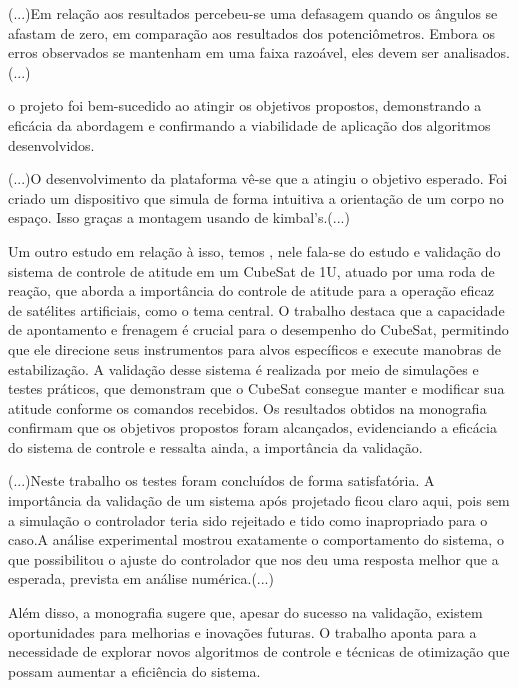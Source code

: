 \documentclass[
	12pt,				%
	openright,			%
	oneside,			%
	a4paper,			%
	english,			%
	brazil				%
	]{abntex2}
\begin{document}
\begin{citacao}
	(...)Em relação aos resultados percebeu-se uma defasagem quando os
	ângulos se afastam de zero, em comparação aos resultados dos potenciômetros. Embora
	os erros observados se mantenham em uma faixa razoável, eles devem ser analisados.(...)
\end{citacao}

 o projeto foi bem-sucedido ao atingir os objetivos propostos, demonstrando a eficácia da abordagem e confirmando a viabilidade de aplicação dos algoritmos desenvolvidos.
 
\begin{citacao}
	(...)O desenvolvimento da plataforma vê-se que a atingiu o objetivo esperado. Foi
	criado um dispositivo que simula de forma intuitiva a orientação de um corpo no espaço.
	Isso graças a montagem usando de kimbal’s.(...)
\end{citacao}


Um outro estudo em relação à isso, temos \cite{faustino2019}, nele fala-se do estudo e validação do sistema de controle de atitude em um CubeSat de 1U, atuado por uma roda de reação, que aborda a importância do controle de atitude para a operação eficaz de satélites artificiais, como o tema central. O trabalho destaca que a capacidade de apontamento e frenagem é crucial para o desempenho do CubeSat, permitindo que ele direcione seus instrumentos para alvos específicos e execute manobras de estabilização.
A validação desse sistema é realizada por meio de simulações e testes práticos, que demonstram que o CubeSat consegue manter e modificar sua atitude conforme os comandos recebidos. Os resultados obtidos na monografia confirmam que os objetivos propostos foram alcançados, evidenciando a eficácia do sistema de controle e ressalta ainda, a importância da validação.

\begin{citacao}
	(...)Neste trabalho os testes foram concluídos de forma satisfatória. A importância da validação de um sistema após projetado ficou claro aqui, pois sem a simulação o controlador teria sido rejeitado e tido como inapropriado para o caso.A análise experimental mostrou exatamente o comportamento do sistema, o que possibilitou o ajuste do controlador que nos deu uma resposta melhor que a esperada, prevista em análise numérica.(...)
\end{citacao}

Além disso, a monografia sugere que, apesar do sucesso na validação, existem oportunidades para melhorias e inovações futuras. O trabalho aponta para a necessidade de explorar novos algoritmos de controle e técnicas de otimização que possam aumentar a eficiência do sistema.
\end{document}
